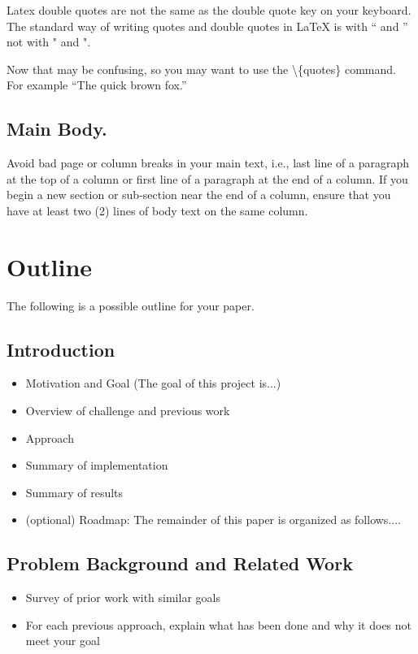 \documentclass[pageno]{jpaper}
\newcommand{\quotes}[1]{``#1''}
\begin{document}
Latex double quotes are not the same as the double quote key on your
keyboard. The standard way of writing quotes and double quotes in
LaTeX is with `` and '' not with " and ".   

Now that may be confusing, so you may want to use the \textbackslash\{quotes\} command.  For
example \quotes{The quick brown fox.}



\subsection{Main Body.}

Avoid bad page or column breaks in
your main text, i.e., last line of a paragraph at the top of a
column or first line of a paragraph at the end of a column. If you
begin a new section or sub-section near the end of a column,
ensure that you have at least two (2)  lines of body text on the same
column. 

\section{Outline}  
The following is a possible outline for your paper.
\subsection{Introduction}
\begin{itemize}
\item Motivation and Goal (The goal of this project is...)
\item Overview of challenge and previous work 
\item Approach 
\item Summary of implementation
\item Summary of results
\item (optional) Roadmap: The remainder of this paper is organized as follows....
\end{itemize}

\subsection{Problem Background and Related Work}
\begin{itemize}
\item Survey of prior work with similar goals 
\item For each previous approach, explain what has been done and why it does not meet your goal
\end{itemize}
\end{document}
